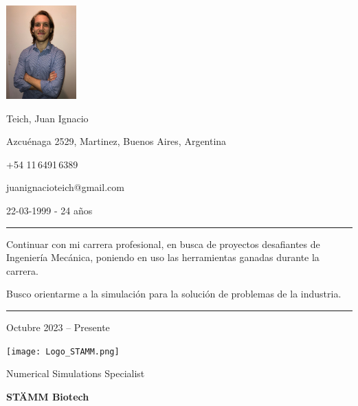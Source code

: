 \documentclass[a4paper,10pt]{article}
\newlength{\cvcolumngapwidth}
\newlength{\cvleftcolumnwidth}
\newlength{\cvrightcolumnwidth}
\newcommand{\cvnamestyle}[1]{{\Large\cvnamefont\textcolor{cvnamecolor}{#1}}}
\newcommand{\cvsectionstyle}[1]{{\normalsize\cvsectionfont\textcolor{cvsectioncolor}{#1}}}
\newcommand{\cvtitlestyle}[1]{{\large\cvtitlefont\textcolor{cvtitlecolor}{#1}}}
\newcommand{\cvdurationstyle}[1]{{\small\cvdurationfont\textcolor{cvdurationcolor}{#1}}}
\newcommand{\cvheadingstyle}[1]{{\normalsize\cvheadingfont\textcolor{cvheadingcolor}{#1}}}
\newlength{\cvafteritemskipamount}
\newlength{\cvaftersectionskipamount}
\newlength{\cvbetweensectionandheadingextraskipamount}
\newlength{\cvafternameskipamount}
\newlength{\cvafterpersonalinfolineskipamount}
\newlength{\cvaftertitleskipamount}
\newlength{\cvparskip}
\newcommand{\cvpersonalinfo}[2]{
    \begin{minipage}[t]{\cvleftcolumnwidth}
        \vspace{0mm} %
        \raggedleft #1
    \end{minipage}%
    \hspace{\cvcolumngapwidth}%
    \begin{minipage}[t]{\cvrightcolumnwidth}
        \vspace{0mm} %
        #2
    \end{minipage}

    \vspace{\cvafteritemskipamount}
}
\newcommand{\cvname}[1]{
    \cvnamestyle{#1}

    \vspace{\cvafternameskipamount}
}
\newcommand{\cvpersonalinfolinewithicon}[3]{
    \raisebox{.5\fontcharht\font`E-.5\height}{\texttt{[image: \#2]}}
    #3

    \vspace{\cvafterpersonalinfolineskipamount}
}
\newcommand{\cvsection}[1]{
    \begin{minipage}[t]{\cvleftcolumnwidth}
        \raggedleft\cvsectionstyle{#1}
    \end{minipage}%
    \hspace{\cvcolumngapwidth}%
    \begin{minipage}[t]{\cvrightcolumnwidth}
        \textcolor{cvrulecolor}{\rule{\cvrightcolumnwidth}{0.3mm}}
    \end{minipage}

    \vspace{\cvaftersectionskipamount}
}
\newcommand{\cvitem}[2]{
    \begin{minipage}[t]{\cvleftcolumnwidth}
        \raggedleft #1
    \end{minipage}%
    \hspace{\cvcolumngapwidth}%
    \begin{minipage}[t]{\cvrightcolumnwidth}
        \setlength{\parskip}{\cvparskip} #2
    \end{minipage}

    \vspace{\cvafteritemskipamount}
}
\newcommand{\cvtitle}[1]{
    \cvtitlestyle{#1}

    \vspace{\cvaftertitleskipamount}
    \vspace{-\cvparskip}
}
\begin{document}

\cvpersonalinfo{
    \includegraphics[height=36mm]{photo.jpg}
}{
    \cvname{Teich, Juan Ignacio}

    \cvpersonalinfolinewithicon{height=4mm}{072-location.pdf}{
        Azcuénaga 2529, Martinez, Buenos Aires, Argentina
    }

    \cvpersonalinfolinewithicon{height=4mm}{067-phone.pdf}{
        +54 11\,6491\,6389
    }

    \cvpersonalinfolinewithicon{height=4mm}{070-envelop.pdf}{
        juanignacioteich@gmail.com
    }


        22-03-1999  -   24 años
}


\cvsection{OBJETIVOS PROFESIONALES}

\vspace{\cvbetweensectionandheadingextraskipamount}
\cvitem{\cvheadingstyle{}}{
    Continuar con mi carrera profesional, en busca de proyectos desafiantes de Ingeniería Mecánica, poniendo en uso las herramientas ganadas durante la carrera.

    Busco orientarme a la simulación para la solución de problemas de la industria.
}


\cvsection{EXPERIENCIA LABORAL}

\cvitem{
	\cvdurationstyle{Octubre 2023 -- Presente}
}{
	\begin{minipage}{0.1\textwidth}
		\centering
		\texttt{[image: Logo\_STAMM.png]}   
	\end{minipage}
	\cvtitle{Numerical Simulations Specialist}
	
	\textbf{STÄMM Biotech}
	
	
}
\end{document}
